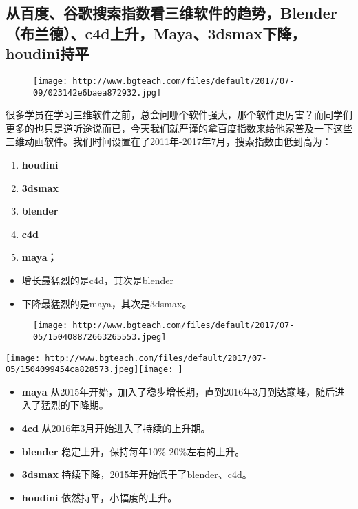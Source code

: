 \documentclass[]{article}
\date{}
\begin{document}
\subsection{从百度、谷歌搜索指数看三维软件的趋势，Blender（布兰德）、c4d上升，Maya、3dsmax下降，houdini持平}\label{header-n4}

\begin{figure}
\centering
\texttt{[image: http://www.bgteach.com/files/default/2017/07-09/023142e6baea872932.jpg]}
\caption{}
\end{figure}

很多学员在学习三维软件之前，总会问哪个软件强大，那个软件更厉害？而同学们更多的也只是道听途说而已，今天我们就严谨的拿百度指数来给他家普及一下这些三维动画软件。我们时间设置在了2011年-2017年7月，搜索指数由低到高为：

\begin{enumerate}
\def\labelenumi{\arabic{enumi}.}
\item
  \textbf{houdini}
\item
  \textbf{3dsmax}
\item
  \textbf{blender}
\item
  \textbf{c4d}
\item
  \textbf{maya；}
\end{enumerate}

\begin{itemize}
\item
  增长最猛烈的是c4d，其次是blender
\item
  下降最猛烈的是maya，其次是3dsmax。
\end{itemize}

\begin{figure}
\centering
\texttt{[image: http://www.bgteach.com/files/default/2017/07-05/150408872663265553.jpeg]}
\caption{}
\end{figure}

\texttt{[image: http://www.bgteach.com/files/default/2017/07-05/1504099454ca828573.jpeg]}\href{http://www.bgteach.com/files/default/2017/07-09/023142e6baea872932.jpg}{\texttt{[image: ]}}

\begin{itemize}
\item
  \textbf{maya
  }从2015年开始，加入了稳步增长期，直到2016年3月到达巅峰，随后进入了猛烈的下降期。
\item
  \textbf{4cd }从2016年3月开始进入了持续的上升期。
\item
  \textbf{blender }稳定上升，保持每年10\%-20\%左右的上升。
\item
  \textbf{3dsmax} 持续下降，2015年开始低于了blender、c4d。
\item
  \textbf{houdini }依然持平，小幅度的上升。
\end{itemize}
\end{document}
